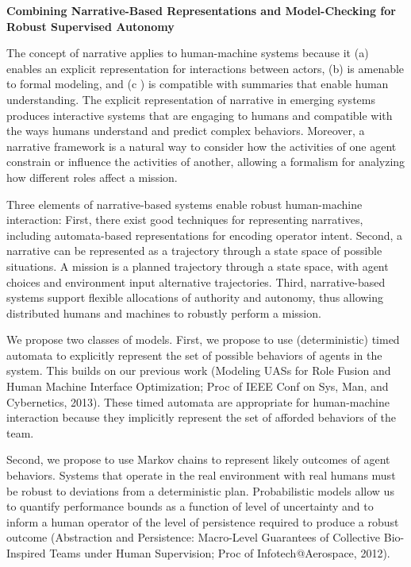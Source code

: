 \documentclass[palatinofont10]{nsfprop}
\begin{document}
\begin{center}
\textbf{Combining Narrative-Based Representations and Model-Checking for Robust Supervised Autonomy}
\end{center}

The concept of narrative applies to human-machine systems because it
(a) enables an explicit representation for interactions between
actors, (b) is amenable to formal modeling, and (c ) is compatible
with summaries that enable human understanding. The explicit
representation of narrative in emerging systems produces interactive
systems that are engaging to humans and compatible with the ways
humans understand and predict complex behaviors. Moreover, a narrative
framework is a natural way to consider how the activities of one agent
constrain or influence the activities of another, allowing a formalism
for analyzing how different roles affect a mission.

Three elements of narrative-based systems enable robust human-machine
interaction: First, there exist good techniques for representing
narratives, including automata-based representations for encoding
operator intent. Second, a narrative can be represented as a
trajectory through a state space of possible situations. A mission is
a planned trajectory through a state space, with agent choices and
environment input alternative trajectories. Third, narrative-based
systems support flexible allocations of authority and autonomy, thus
allowing distributed humans and machines to robustly perform a
mission.

We propose two classes of models. First, we propose to use
(deterministic) timed automata to explicitly represent the set of
possible behaviors of agents in the system. This builds on our
previous work (Modeling UASs for Role Fusion and Human Machine
Interface Optimization; Proc of IEEE Conf on Sys, Man, and
Cybernetics, 2013). These timed automata are appropriate for
human-machine interaction because they implicitly represent the set of
afforded behaviors of the team.

Second, we propose to use Markov chains to represent likely outcomes
of agent behaviors. Systems that operate in the real environment with
real humans must be robust to deviations from a deterministic
plan. Probabilistic models allow us to quantify performance bounds as
a function of level of uncertainty and to inform a human operator of
the level of persistence required to produce a robust outcome
(Abstraction and Persistence: Macro-Level Guarantees of Collective
Bio-Inspired Teams under Human Supervision; Proc of
Infotech@Aerospace, 2012).
\end{document}
